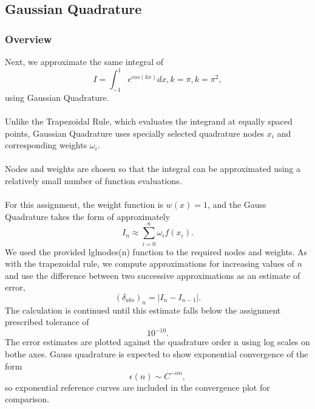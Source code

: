 \documentclass[12pt]{article}
\begin{document}
\newpage
\subsection{Gaussian Quadrature}

\subsubsection{Overview}
Next, we approximate the same integral of
\begin{equation}
    I = \int_{-1}^{1}e^{cos(kx)}dx, k = \pi, k = \pi^2,
\end{equation}
using Gaussian Quadrature. \\\\
Unlike the Trapezoidal Rule, which evaluates the integrand at equally spaced points, Gaussian Quadrature uses specially selected quadrature nodes $x_i$ and corresponding weights $\omega_i$.\\\\ 
Nodes and weights are chosen so that the integral can be approximated using a relatively small number of function evaluations. \\\\
For this assignment, the weight function is $w(x) = 1$, and the Gauss Quadrature takes the form of approximately \begin{equation}
    I_n \approx \sum_{i=0}^{n}\omega_if(x_i).
\end{equation}
We used the provided lglnodes(n) function to the required nodes and weights. 
As with the trapezoidal rule, we compute approximations for increasing values of $n$ and use the difference between two successive approximations as an estimate of error, \begin{equation}
    (\delta_{abs})_n = |I_n - I_{n-1}|.
\end{equation}
The calculation is continued until this estimate falls below the assignment prescribed tolerance of \begin{equation}
    10^{-10}.
\end{equation}
The error estimates are plotted against the quadrature order n using log scales on bothe axes. Gauss quadrature is expected to show exponential convergence of the form \begin{equation}
    \epsilon(n) \sim C^{-\alpha n},
\end{equation}
so exponential reference curves are included in the convergence plot for comparison. 
\end{document}
